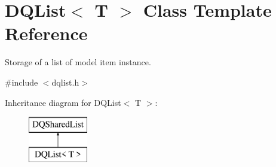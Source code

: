 \hypertarget{classDQList}{
\section{DQList$<$ T $>$ Class Template Reference}
\label{classDQList}
}


Storage of a list of model item instance.  




{\ttfamily \#include $<$dqlist.h$>$}

Inheritance diagram for DQList$<$ T $>$:\begin{figure}[H]
\begin{center}
\leavevmode
\includegraphics[height=2.000000cm]{classDQList}
\end{center}
\end{figure}
